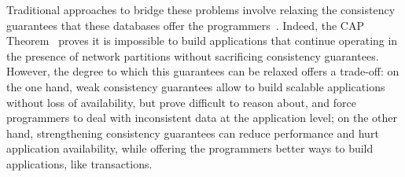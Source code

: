 

Traditional approaches to bridge these problems involve relaxing the consistency guarantees that these databases offer the programmers~\citep{vogels-eventual}. Indeed, the CAP Theorem~\citep{cap-brewer, cap-theorem} proves it is impossible to build applications that continue operating in the presence of network partitions without sacrificing consistency guarantees. However, the degree to which this guarantees can be relaxed offers a trade-off: on the one hand, weak consistency guarantees allow to build scalable applications without loss of availability, but prove difficult to reason about, and force programmers to deal with inconsistent data at the application level; on the other hand, strengthening consistency guarantees can reduce performance and hurt application availability, while offering the programmers better ways to build applications, like transactions.



